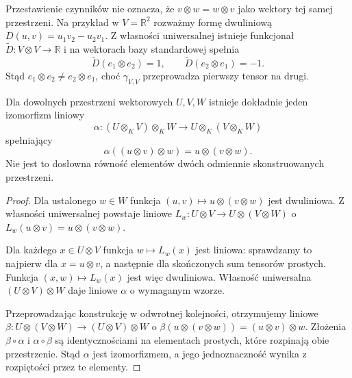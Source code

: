 Przestawienie czynników nie oznacza,
że \(v\otimes w=w\otimes v\)
jako wektory tej samej przestrzeni.
Na przykład w
\(V=\mathbb R^2\) rozważmy formę
dwuliniową
\(D(u,v)=u_1v_2-u_2v_1\).
Z własności uniwersalnej istnieje
funkcjonał
\(\widetilde D\colon V\otimes V\to\mathbb R\)
i na wektorach bazy standardowej
spełnia
\[
 \widetilde D(e_1\otimes e_2)=1,
 \qquad
 \widetilde D(e_2\otimes e_1)=-1.
\]
Stąd \(e_1\otimes e_2\ne
e_2\otimes e_1\), choć
\(\gamma_{V,V}\) przeprowadza
pierwszy tensor na drugi.

\begin{twierdzenie}
\label{thm:lin10-lacznosc}
Dla dowolnych przestrzeni
wektorowych \(U,V,W\) istnieje
dokładnie jeden izomorfizm liniowy
\[
 \alpha\colon (U\otimes_KV)\otimes_KW
 \longrightarrow U\otimes_K(V\otimes_KW)
\]
spełniający
\[
 \alpha((u\otimes v)\otimes w)
 =u\otimes(v\otimes w).
\]
Nie jest to dosłowna równość
elementów dwóch odmiennie
skonstruowanych przestrzeni.
\end{twierdzenie}
\begin{proof}
Dla ustalonego \(w\in W\)
funkcja
\((u,v)\mapsto u\otimes(v\otimes w)\)
jest dwuliniowa.
Z własności uniwersalnej
powstaje liniowe
\(L_w\colon U\otimes V\to
U\otimes(V\otimes W)\)
o
\(L_w(u\otimes v)=u\otimes(v\otimes w)\).

Dla każdego \(x\in U\otimes V\)
funkcja \(w\mapsto L_w(x)\)
jest liniowa: sprawdzamy to
najpierw dla \(x=u\otimes v\),
a następnie dla skończonych
sum tensorów prostych.
Funkcja \((x,w)\mapsto L_w(x)\)
jest więc dwuliniowa.
Własność uniwersalna
\((U\otimes V)\otimes W\)
daje liniowe \(\alpha\)
o wymaganym wzorze.

Przeprowadzając konstrukcję
w odwrotnej kolejności,
otrzymujemy liniowe
\(\beta\colon U\otimes(V\otimes W)
\to (U\otimes V)\otimes W\)
o \(\beta(u\otimes(v\otimes w))
=(u\otimes v)\otimes w\).
Złożenia \(\beta\circ\alpha\)
i \(\alpha\circ\beta\)
są identycznościami
na elementach prostych,
które rozpinają obie przestrzenie.
Stąd \(\alpha\) jest izomorfizmem,
a jego jednoznaczność wynika
z rozpiętości przez te elementy.
\end{proof}


